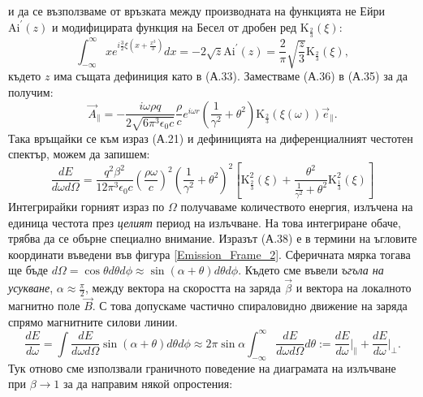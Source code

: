 \begin{appendices}
\begin{equation}
\end{equation}
и да се възползваме от връзката между производната на функцията не Ейри $\text{Ai}^\prime(z)$ и модифицирата функция на Бесел от дробен ред $\text{K}_{\frac{2}{3}}(\xi)$:
\begin{equation}
	\int_{-\infty}^\infty x e^{i\frac{3}{2}\xi\left(x + \frac{x^3}{3}\right)}dx = -2\sqrt{z}\text{Ai}^\prime (z) =\frac{2}{\pi}\sqrt{\frac{z}{3}}\text{K}_{\frac{2}{3}}(\xi),
\end{equation}
където $z$ има същата дефиниция като в (А.33). Заместваме (А.36) в (А.35) за да получим:
\begin{equation}
	\vec{A}_\parallel = -\frac{i\omega\rho q}{2\sqrt{6\pi^3\epsilon_0 c}}\frac{\rho}{c}e^{i\omega r}\left( \frac{1}{\gamma^2} + \theta^2 \right) \text{K}_{\frac{2}{3}}(\xi(\omega))\vec{e}_\parallel.
\end{equation}
Така връщайки се към израз (А.21) и дефиницията на диференциалният честотен спектър, можем да запишем:
\begin{equation}
	\frac{dE}{d\omega d\Omega} = \frac{q^2\beta^2}{12\pi^3\epsilon_0 c}\left(\frac{\rho\omega}{c}\right)^2\left(\frac{1}{\gamma^2}+\theta^2\right)^2\left[\text{K}^2_{\frac{2}{3}}(\xi) + \frac{\theta^2}{\frac{1}{\gamma^2} + \theta^2}\text{K}^2_{\frac{1}{3}}(\xi)\right]
\end{equation}
Интегрирайки горният израз по $\Omega$ получаваме количеството енергия, излъчена на единица честота през \emph{целият} период на излъчване. На това интегриране обаче, трябва да се обърне специално внимание. Изразът (А.38) е в термини на ъгловите координати въведени във фигура \ref{Emission_Frame_2}. Сферичната мярка тогава ще бъде $d\Omega = \cos\theta d\theta d\phi \approx \sin(\alpha + \theta) d\theta d\phi $. Където сме въвели \emph{ъгъла на усукване}, $\alpha \approx \frac{\pi}{2}$, между вектора на скоростта на заряда $\vec{\beta}$ и вектора на локалното магнитно поле $\vec{B}$. С това допускаме частично спираловидно движение на заряда спрямо магнитните силови линии.
\begin{equation}
	\frac{dE}{d\omega} = \int \frac{dE}{d\omega d\Omega} \sin(\alpha + \theta) d\theta d\phi \approx 2\pi \sin\alpha \int_{-\infty}^\infty \frac{dE}{d\omega d\Omega}d\theta:=\frac{dE}{d\omega}\bigg\vert_\parallel + \frac{dE}{d\omega}\bigg\vert_\perp.
\end{equation}
Тук отново сме използвали граничното поведение на диаграмата на излъчване при $\beta\rightarrow 1$ за да направим някой опростения:\\


\end{appendices}
